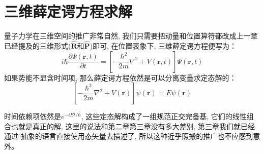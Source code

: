 \documentclass[a4paper,zihao=-4,linespread=1]{ctexrep}
\newenvironment{lequation}{\large\begin{equation}}{\end{equation}}
\begin{document}
    \section{三维薛定谔方程求解}
    量子力学在三维空间的推广非常自然, 我们只需要把动量和位置算符都改成上一章已经提及的三维形式($\hat{\bm{R}}$和$\hat{\bm{P}}$)即可, 在位置表象下, 三维薛定谔方程便写为：
    \begin{lequation}
        \boxed{
            i\hbar\frac{\partial \Psi\left(\bm{r},t\right)}{\partial t}=\left[-\frac{\hbar^{2}}{2m}\nabla^{2}+
            V\left(\bm{r},t\right)\right]\Psi\left(\bm{r},t\right) 
        }
    \end{lequation}
    如果势能不显含时间项, 那么薛定谔方程依然是可以分离变量求定态解的：
    \begin{lequation}
        \label{eq:4.2}
        \boxed{
            \left[-\frac{\hbar^{2}}{2m}\nabla^{2}+
            V\left(\bm{r}\right)\right]\psi\left(\bm{r}\right)=E\psi \left(\bm{r}\right)
        }
    \end{lequation}
    
    时间依赖项依然是$e^{-iEt/\hbar}$, 这些定态解构成了一组规范正交完备基, 它们的线性组合也就是真正的解, 这里的说法和第二章第三章没有多大差别, 第三章我们就已经通过
    抽象的语言直接使用态矢量去描述了, 所以这种近乎照搬的推广也不应感到意外。
\end{document}
